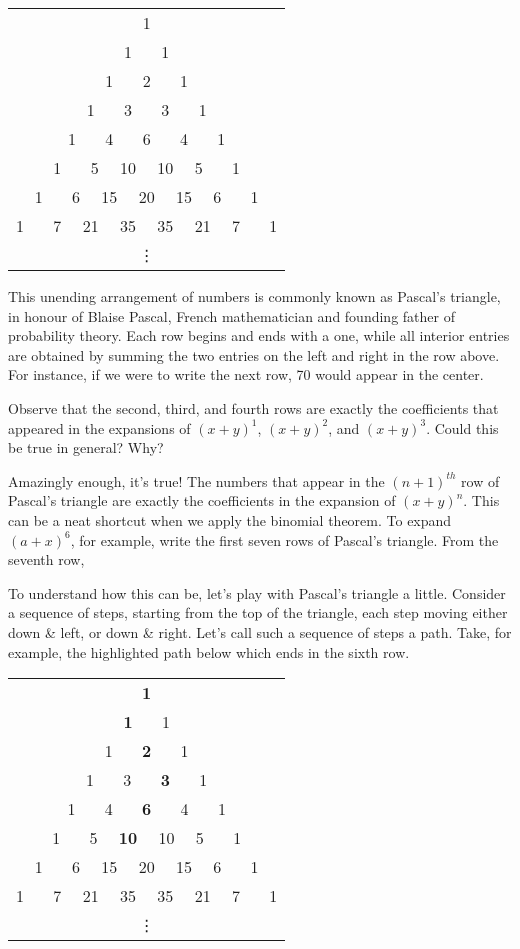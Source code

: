 \begin{center}
\begin{tabular}{c}
1 \\
1 \ \ \ 1 \\
1 \ \ \ 2 \ \ \ 1 \\
1 \ \ \ 3 \ \ \ 3  \ \ \ 1 \\
1 \ \ \ 4 \ \ \ 6 \ \ \ 4  \ \ \ 1 \\
1 \ \ \ 5 \, \  10 \ \ 10  \, \ 5  \ \ \ 1 \\
1 \ \ \ 6 \, \ 15 \ \ 20 \ \  15 \, \ 6 \ \ \ 1 \\
1 \ \ \ 7 \, \ 21 \ \ 35 \ \ 35  \ \  21 \, \ 7 \ \ \ 1 \\
\vdots
\end{tabular}
\end{center}

This unending arrangement of numbers is commonly known as Pascal's triangle, in honour of Blaise Pascal, French mathematician and founding father of probability theory. Each row begins and ends with a one, while all interior entries are obtained by summing the two entries on the left and right in the row above. For instance, if we were to write the next row, 70 would appear in the center.
\par
Observe that the second, third, and fourth rows are exactly the coefficients that appeared in the expansions of $(x+y)^1$, $(x+y)^2$, and $(x+y)^3$. Could this be true in general? Why?
\par
Amazingly enough, it's true! The numbers that appear in the $(n+1)^{th}$ row of Pascal's triangle are exactly the coefficients in the expansion of $(x+y)^n$. This can be a neat shortcut when we apply the binomial theorem. To expand $(a+x)^6$, for example, write the first seven rows of Pascal's triangle. From the seventh row,
\par
To understand how this can be, let's play with Pascal's triangle a little. Consider a sequence of steps, starting from the top of the triangle, each step moving either down \& left, or down \& right. Let's call such a sequence of steps a path. Take, for example, the highlighted path below which ends in the sixth row.

\begin{center}
\begin{tabular}{c}
\textbf{1} \\
\textbf{1} \ \ \ 1 \\
1 \ \ \ \textbf{2} \ \ \ 1 \\
1 \ \ \ 3 \ \ \ \textbf{3}  \ \ \ 1 \\
1 \ \ \ 4 \ \ \ \textbf{6} \ \ \ 4  \ \ \ 1 \\
1 \ \ \ 5 \, \  \textbf{10} \ \ 10  \, \ 5  \ \ \ 1 \\
1 \ \ \ 6 \, \ 15 \ \ 20 \ \  15 \, \ 6 \ \ \ 1 \\
1 \ \ \ 7 \, \ 21 \ \ 35 \ \ 35  \ \  21 \, \ 7 \ \ \ 1 \\
\vdots
\end{tabular}
\end{center}

